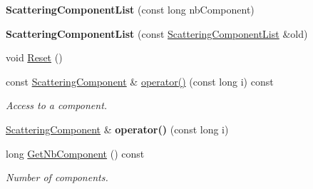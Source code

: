 \begin{DoxyCompactItemize}
\item 
\mbox{\label{class_obj_cryst_1_1_scattering_component_list_a5d75cfe634f123de9c84c928dfea1eaa}} 
{\bfseries Scattering\+Component\+List} (const long nb\+Component)
\item 
\mbox{\label{class_obj_cryst_1_1_scattering_component_list_ac1b58052220493fab0712ebc9d8bc481}} 
{\bfseries Scattering\+Component\+List} (const \mbox{\hyperlink{class_obj_cryst_1_1_scattering_component_list}{Scattering\+Component\+List}} \&old)
\item 
void \mbox{\hyperlink{class_obj_cryst_1_1_scattering_component_list_a512dcd4870c53b3f98ad6e7b04be9801}{Reset}} ()
\item 
\mbox{\label{class_obj_cryst_1_1_scattering_component_list_a3dcdc8d9d21369c3405261386aa76e33}} 
const \mbox{\hyperlink{struct_obj_cryst_1_1_scattering_component}{Scattering\+Component}} \& \mbox{\hyperlink{class_obj_cryst_1_1_scattering_component_list_a3dcdc8d9d21369c3405261386aa76e33}{operator()}} (const long i) const
\begin{DoxyCompactList}\small\item\em Access to a component. \end{DoxyCompactList}\item 
\mbox{\label{class_obj_cryst_1_1_scattering_component_list_a9f7bc047fb617508f2415dde0430febc}} 
\mbox{\hyperlink{struct_obj_cryst_1_1_scattering_component}{Scattering\+Component}} \& {\bfseries operator()} (const long i)
\item 
\mbox{\label{class_obj_cryst_1_1_scattering_component_list_acda94d3d6f78467a7f56c0cf9aed1973}} 
long \mbox{\hyperlink{class_obj_cryst_1_1_scattering_component_list_acda94d3d6f78467a7f56c0cf9aed1973}{Get\+Nb\+Component}} () const
\begin{DoxyCompactList}\small\item\em Number of components. \end{DoxyCompactList}\item 
\mbox{\label{class_obj_cryst_1_1_scattering_component_list_a93c5514484bd8d32a346e1c4a155a4a3}} 

\end{DoxyCompactItemize}
